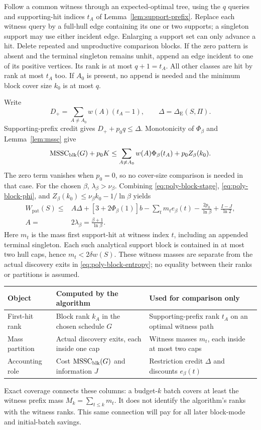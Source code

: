 Follow a common witness through an expected-optimal tree, using the
$q$ queries and supporting-hit indices $t_A$ of
Lemma~\ref{lem:support-prefix}. Replace each witness query by a full-hull
edge containing its one or two supports; a singleton support may use
either incident edge. Enlarging a support set can only advance a hit.
Delete repeated and unproductive comparison blocks. If the zero
pattern is absent and the terminal singleton remains unhit, append an
edge incident to one of its positive vertices. Its rank is at most
$q+1=t_A$. All other classes are hit by rank at most $t_A$ too.
If $A_0$ is present, no append is needed and the minimum block cover
size $k_0$ is at most $q$.

Write
\[
 D_+=\sum_{A\ne A_0}w(A)(t_A-1),\qquad
 \Delta=\Delta_{\mathrm E}(S,\Pi).
\]
Supporting-prefix credit gives $D_++p_0q\le\Delta$.
Monotonicity of $\Phi_\beta$ and Lemma~\ref{lem:mssc} give
\[
 \operatorname{MSSC}_{\mathrm{blk}}(G)+p_0K
 \le\sum_{A\ne A_0}w(A)\Phi_\beta(t_A)+p_0 Z_\beta(k_0).
\]
The zero term vanishes when $p_0=0$, so no cover-size comparison is
needed in that case. For the chosen $\beta$, $\lambda_\beta>\nu_\beta$.
Combining \eqref{eq:poly-block-stage}, \eqref{eq:poly-block-phi}, and
$Z_\beta(k_0)\le\nu_\beta k_0-1/\ln\beta$ yields
\begin{equation}\label{eq:poly-block-discrete}
 \begin{aligned}
 W_{\mathrm{pat}}(S)\le{}&
 A\Delta+[3+2\Phi_\beta(1)]b
 -\sum_t m_t e_\beta(t)-\frac{2p_0}{\ln\beta}
 +\frac{I-J}{\ln2},\\
 A={}&2\lambda_\beta=\frac{\beta+1}{\ln\beta}.
 \end{aligned}
\end{equation}
Here $m_t$ is the mass first support-hit at witness index $t$, including
an appended terminal singleton. Each such analytical support block is
contained in at most two hull caps, hence $m_t<2\delta w(S)$.
These witness masses are separate from the actual discovery exits in
\eqref{eq:poly-block-entropy}; no equality between their ranks or
partitions is assumed.

\begin{center}
\small
\begin{tabular}{@{}p{.25\linewidth}p{.34\linewidth}p{.34\linewidth}@{}}
\hline
Object & Computed by the algorithm & Used for comparison only\\
\hline
First-hit rank & Block rank $k_A$ in the chosen schedule $G$
 & Supporting-prefix rank $t_A$ on an optimal witness path\\
Mass partition & Actual discovery exits, each inside one cap
 & Witness masses $m_t$, each inside at most two caps\\
Accounting role & Cost $\operatorname{MSSC}_{\rm blk}(G)$ and information $J$
 & Restriction credit $\Delta$ and discounts $e_\beta(t)$\\
\hline
\end{tabular}
\end{center}
Exact coverage connects these columns: a budget-$k$ batch covers at
least the witness prefix mass $M_k=\sum_{t\le k}m_t$. It does not
identify the algorithm's ranks with the witness ranks. This same
connection will pay for all later block-mode and initial-batch savings.

